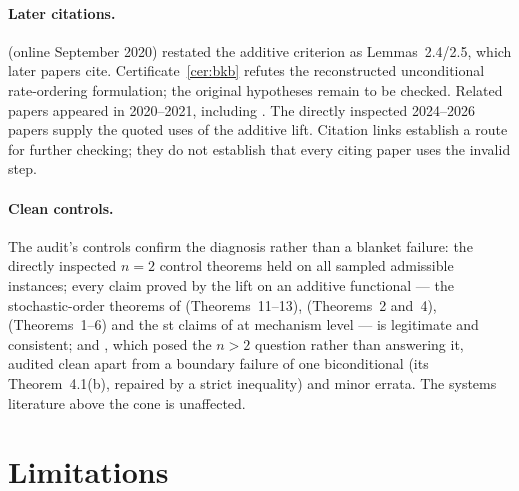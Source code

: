 \documentclass[10pt]{article}
\theoremstyle{plain}
\theoremstyle{definition}
\theoremstyle{remark}
\begin{document}
\paragraph{Later citations.} \cite{BarmalzanKosariBalakrishnan2022} (online September 2020) restated the additive criterion as Lemmas~2.4/2.5, which later papers cite. Certificate~\ref{cer:bkb} refutes the reconstructed unconditional rate-ordering formulation; the original hypotheses remain to be checked. Related papers appeared in 2020--2021, including \cite{NadebTorabi2022,BarmalzanKosariZhang2021,SattariBarmalzanBalakrishnan2021,PanjaKunduPradhan2022}. The directly inspected 2024--2026 papers supply the quoted uses of the additive lift. Citation links establish a route for further checking; they do not establish that every citing paper uses the invalid step.

\paragraph{Clean controls.} The audit's controls confirm the diagnosis rather than a blanket failure: the directly inspected $n=2$ control theorems held on all sampled admissible instances; every claim proved by the lift on an additive functional --- the stochastic-order theorems of \cite{BhaktaKayalFinkelstein2024} (Theorems~11--13), \cite{GuoYan2024} (Theorems~2 and~4), \cite{SahooKayalBalakrishnan2026} (Theorems~1--6) and the st claims of \cite{BarmalzanKosariBalakrishnan2022} at mechanism level --- is legitimate and consistent; and \cite{ShojaeeAsadiFinkelstein2022}, which posed the $n>2$ question rather than answering it, audited clean apart from a boundary failure of one biconditional (its Theorem~4.1(b), repaired by a strict inequality) and minor errata. The systems literature above the cone is unaffected.

\section{Limitations}\label{sec:limits}
\end{document}
